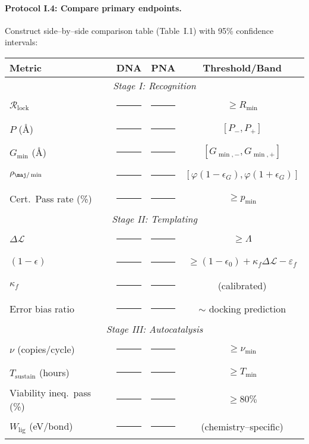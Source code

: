 \documentclass[11pt]{article}
\begin{document}
\paragraph{Protocol I.4: Compare primary endpoints.}
Construct side–by–side comparison table (Table~I.1) with 95\% confidence intervals:

\begin{center}
\small
\begin{tabular}{l|cc|c}
\hline
\textbf{Metric} & \textbf{DNA} & \textbf{PNA} & \textbf{Threshold/Band}\\
\hline
\multicolumn{4}{c}{\emph{Stage I: Recognition}}\\
$\mathcal{R}_{\mathrm{lock}}$ & \rule{1cm}{0.4pt} & \rule{1cm}{0.4pt} & $\ge R_{\min}$\\
$P$ (\AA) & \rule{1cm}{0.4pt} & \rule{1cm}{0.4pt} & $[P_-,P_+]$\\
$G_{\min}$ (\AA) & \rule{1cm}{0.4pt} & \rule{1cm}{0.4pt} & $[G_{\min,-},G_{\min,+}]$\\
$\rho_{\maj/\min}$ & \rule{1cm}{0.4pt} & \rule{1cm}{0.4pt} & $[\varphi(1-\epsilon_G),\varphi(1+\epsilon_G)]$\\
Cert.\ Pass rate (\%) & \rule{1cm}{0.4pt} & \rule{1cm}{0.4pt} & $\ge p_{\min}$\\
\hline
\multicolumn{4}{c}{\emph{Stage II: Templating}}\\
$\Delta\mathcal{L}$ & \rule{1cm}{0.4pt} & \rule{1cm}{0.4pt} & $\ge\Lambda$\\
$(1-\epsilon)$ & \rule{1cm}{0.4pt} & \rule{1cm}{0.4pt} & $\ge(1-\epsilon_0)+\kappa_f\Delta\mathcal{L}-\varepsilon_f$\\
$\kappa_f$ & \rule{1cm}{0.4pt} & \rule{1cm}{0.4pt} & (calibrated)\\
Error bias ratio & \rule{1cm}{0.4pt} & \rule{1cm}{0.4pt} & $\sim$ docking prediction\\
\hline
\multicolumn{4}{c}{\emph{Stage III: Autocatalysis}}\\
$\nu$ (copies/cycle) & \rule{1cm}{0.4pt} & \rule{1cm}{0.4pt} & $\ge\nu_{\min}$\\
$T_{\mathrm{sustain}}$ (hours) & \rule{1cm}{0.4pt} & \rule{1cm}{0.4pt} & $\ge T_{\min}$\\
Viability ineq.\ pass (\%) & \rule{1cm}{0.4pt} & \rule{1cm}{0.4pt} & $\ge 80\%$\\
$W_{\mathrm{lig}}$ (eV/bond) & \rule{1cm}{0.4pt} & \rule{1cm}{0.4pt} & (chemistry–specific)\\
\hline
\end{tabular}
\end{center}
\end{document}
